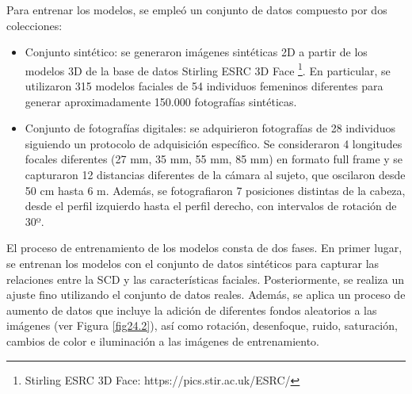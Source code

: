Para entrenar los modelos, se empleó un conjunto de datos compuesto por dos colecciones: 

\begin{itemize}
	\item Conjunto sintético: se generaron imágenes sintéticas 2D a partir de los modelos 3D de la base de datos Stirling ESRC 3D Face \footnote{Stirling ESRC 3D Face: https://pics.stir.ac.uk/ESRC/}. En particular, se utilizaron 315 modelos faciales de 54 individuos femeninos diferentes para generar aproximadamente 150.000 fotografías sintéticas.
	\item Conjunto de fotografías digitales: se adquirieron fotografías de 28 individuos siguiendo un protocolo de adquisición específico. Se consideraron 4 longitudes focales diferentes (27 mm, 35 mm, 55 mm, 85 mm) en formato full frame y se capturaron 12 distancias diferentes de la cámara al sujeto, que oscilaron desde 50 cm hasta 6 m. Además, se fotografiaron 7 posiciones distintas de la cabeza, desde el perfil izquierdo hasta el perfil derecho, con intervalos de rotación de 30º. 
\end{itemize}


El proceso de entrenamiento de los modelos consta de dos fases. En primer lugar, se entrenan los modelos con el conjunto de datos sintéticos para capturar las relaciones entre la SCD y las características faciales. Posteriormente, se realiza un ajuste fino utilizando el conjunto de datos reales. Además, se aplica un proceso de aumento de datos que incluye la adición de diferentes fondos aleatorios a las imágenes (ver Figura \ref{fig24.2}), así como rotación, desenfoque, ruido, saturación, cambios de color e iluminación a las imágenes de entrenamiento.

